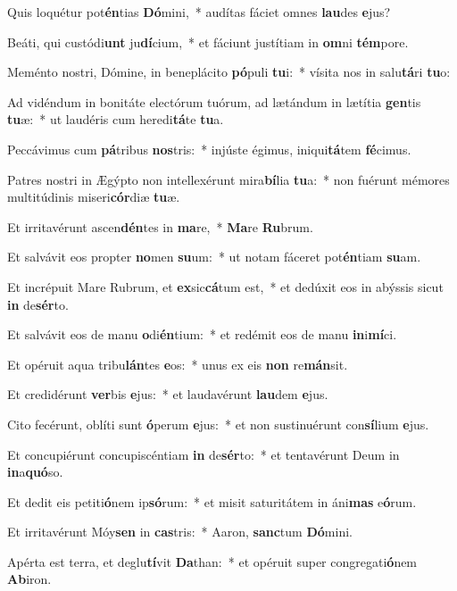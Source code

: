 \item Quis loquétur pot\textbf{én}tias \textbf{Dó}mini,~* audítas fáciet omnes \textbf{lau}des \textbf{e}jus?
\item Beáti, qui custódi\textbf{unt} ju\textbf{dí}cium,~* et fáciunt justítiam in \textbf{om}ni \textbf{tém}pore.
\item Meménto nostri, Dómine, in beneplácito \textbf{pó}puli \textbf{tu}i:~* vísita nos in salu\textbf{tá}ri \textbf{tu}o:
\item Ad vidéndum in bonitáte electórum tuórum, ad lætándum in lætítia \textbf{gen}tis \textbf{tu}æ:~* ut laudéris cum heredi\textbf{tá}te \textbf{tu}a.
\item Peccávimus cum \textbf{pá}tribus \textbf{nos}tris:~* injúste égimus, iniqui\textbf{tá}tem \textbf{fé}cimus.
\item Patres nostri in Ægýpto non intellexérunt mira\textbf{bí}lia \textbf{tu}a:~* non fuérunt mémores multitúdinis miseri\textbf{cór}diæ \textbf{tu}æ.
\item Et irritavérunt ascen\textbf{dén}tes in \textbf{ma}re,~* \textbf{Ma}re \textbf{Ru}brum.
\item Et salvávit eos propter \textbf{no}men \textbf{su}um:~* ut notam fáceret pot\textbf{én}tiam \textbf{su}am.
\item Et incrépuit Mare Rubrum, et \textbf{ex}sic\textbf{cá}tum est,~* et dedúxit eos in abýssis sicut \textbf{in} de\textbf{sér}to.
\item Et salvávit eos de manu \textbf{o}di\textbf{én}tium:~* et redémit eos de manu \textbf{in}i\textbf{mí}ci.
\item Et opéruit aqua tribu\textbf{lán}tes \textbf{e}os:~* unus ex eis \textbf{non} re\textbf{mán}sit.
\item Et credidérunt \textbf{ver}bis \textbf{e}jus:~* et laudavérunt \textbf{lau}dem \textbf{e}jus.
\item Cito fecérunt, oblíti sunt \textbf{ó}perum \textbf{e}jus:~* et non sustinuérunt con\textbf{sí}lium \textbf{e}jus.
\item Et concupiérunt concupiscéntiam \textbf{in} de\textbf{sér}to:~* et tentavérunt Deum in \textbf{in}a\textbf{quó}so.
\item Et dedit eis petiti\textbf{ó}nem ip\textbf{só}rum:~* et misit saturitátem in áni\textbf{mas} e\textbf{ó}rum.
\item Et irritavérunt Móy\textbf{sen} in \textbf{cas}tris:~* Aaron, \textbf{sanc}tum \textbf{Dó}mini.
\item Apérta est terra, et deglu\textbf{tí}vit \textbf{Da}than:~* et opéruit super congregati\textbf{ó}nem \textbf{Ab}iron.
